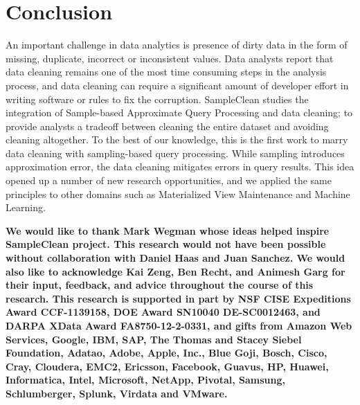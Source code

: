 \section{Conclusion}
An important challenge in data analytics is presence of dirty data
in the form of missing, duplicate, incorrect or inconsistent values.
Data analysts report that data cleaning remains one of the most time
consuming steps in the analysis process, and data cleaning can require
a significant amount of developer effort in writing software or rules
to fix the corruption. 
SampleClean studies the integration of Sample-based Approximate Query Processing and data cleaning; to provide analysts a tradeoff between cleaning the entire dataset and avoiding cleaning altogether.
To the best of our knowledge, this is the first work to marry data cleaning with sampling-based query processing.
While sampling introduces approximation error, the data cleaning mitigates errors in query results.
This idea opened up a number of new research opportunities, and we applied the same principles to other domains such as Materialized View Maintenance and Machine Learning.

\vspace{0.5em}

\textbf{\scriptsize We would like to thank Mark Wegman whose ideas helped inspire SampleClean project.
This research would not have been possible without collaboration
with Daniel Haas and Juan Sanchez.
We would also like to acknowledge Kai Zeng, Ben Recht, and Animesh Garg for their input, feedback, and advice throughout the course of this research.
This research is supported in part by NSF CISE Expeditions Award CCF-1139158, DOE Award SN10040 DE-SC0012463, and DARPA XData Award FA8750-12-2-0331, and gifts from Amazon Web Services, Google, IBM, SAP, The Thomas and Stacey Siebel Foundation, Adatao, Adobe, Apple, Inc., Blue Goji, Bosch, Cisco, Cray, Cloudera, EMC2, Ericsson, Facebook, Guavus, HP, Huawei, Informatica, Intel, Microsoft, NetApp, Pivotal, Samsung, Schlumberger, Splunk, Virdata and VMware.}